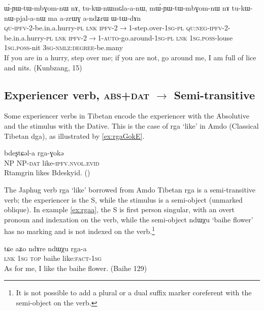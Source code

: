 \documentclass[oldfontcommands,oneside,a4paper,11pt]{article}
\newcommand{\ipa}[1]{{\phon \mbox{#1}}} %
\begin{document}
\begin{exe}
\ex \label{ex:tukWnWpjalanW}
\gll
\ipa{ɯ́-ɲɯ-tɯ-mbɣom-nɯ}  	\ipa{nɤ,}  	\ipa{tu-kɯ-nɯmɢla-a-nɯ,}  \ipa{mɯ́-ɲɯ-tɯ-mbɣom-nɯ}  	\ipa{nɤ}  	\ipa{tu-kɯ-nɯ-pjal-a-nɯ}  	\ipa{ma}  	\ipa{a-zrɯɣ}  	\ipa{a-ndʑrɯ}  	\ipa{ɯ-tɯ-dɤn} \\
\textsc{qu-ipfv}-2-be.in.a.hurry-\textsc{pl} \textsc{lnk} \textsc{ipfv}-2$\rightarrow$1-step.over-\textsc{1sg-pl} \textsc{qu:neg-ipfv}-2-be.in.a.hurry-\textsc{pl} \textsc{lnk} \textsc{ipfv}-2$\rightarrow$1-\textsc{auto}-go.around-\textsc{1sg-pl} \textsc{lnk}   \textsc{1sg.poss}-louse \textsc{1sg.poss}-nit \textsc{3sg-nmlz:degree}-be.many \\
\glt If you are in a hurry, step over me; if you are not, go around me, I am full of lice and nits. (Kunbzang, 15)
\end{exe}


\subsection{Experiencer verb, \textsc{abs+dat} $\rightarrow$ Semi-transitive}
Some experiencer verbs in Tibetan encode the experiencer with the Absolutive and the stimulus with the Dative. This is the case of \ipa{rga} `like' in Amdo (Classical Tibetan \ipa{dga}), as illustrated by \ref{ex:rgaGokE}.

\begin{exe}
\ex \label{ex:rgaGokE}
\gll \ipa{ʂtamɖʐən}  \ipa{bdeʂtɕəl-a}  \ipa{rga-ɣokə} \\
NP NP-\textsc{dat} like-\textsc{ipfv.nvol.evid} \\
\glt Rtamgrin likes Bdeskyid. (\citealt[123:547]{haller04themchen})
\end{exe}

The Japhug verb \ipa{rga} `like' borrowed from Amdo Tibetan \ipa{rga} is a semi-transitive verb; the experiencer is the S, while the stimulus is a semi-object (unmarked oblique). In example \ref{ex:rgaa}, the S is first person singular,  with an overt pronoun and indexation on the verb, while the semi-object \ipa{ndɯχu} `baihe flower' has no marking and is not indexed on the verb.\footnote{It is not possible to add a plural or a dual suffix marker coreferent with the semi-object on the verb.}  

\begin{exe}
\ex \label{ex:rgaa}
\gll
\ipa{tɕe} 	\ipa{aʑo} 	\ipa{ndɤre} 	\ipa{ndɯχu} 	\ipa{rga-a} \\
\textsc{lnk} \textsc{1sg} \textsc{top} baihe like:\textsc{fact}-\textsc{1sg} \\
\glt As for me, I like the baihe flower.
(Baihe 129)
\end{exe}
\end{document}
